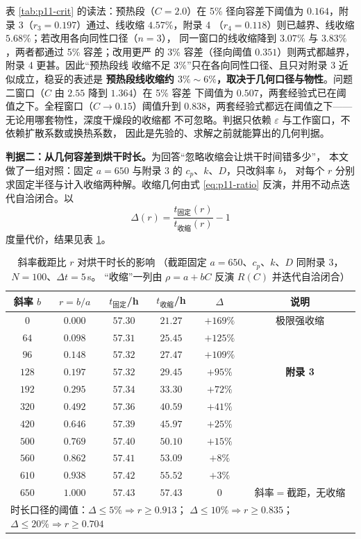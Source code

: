 \documentclass[12pt,a4paper,fontset=none]{ctexart}
\begin{document}
表 \ref{tab:p11-crit} 的读法：预热段（$C=2.0$）在 5\% 径向容差下阈值为
$0.164$，附录 3（$r_3=0.197$）通过、线收缩 $4.57\%$，附录 4
（$r_4=0.118$）则已越界、线收缩 $5.68\%$；若改用各向同性口径（$n=3$），
同一窗口的线收缩降到 $3.07\%$ 与 $3.83\%$，两者都通过 5\% 容差；改用更严
的 3\% 容差（径向阈值 $0.351$）则两式都越界，附录 4 更甚。因此“预热段线
收缩不足 $3\%$”只在各向同性口径、且只对附录 3 近似成立，稳妥的表述是
\textbf{预热段线收缩约 $3\%\sim6\%$，取决于几何口径与物性}。问题二窗口（$C$ 由 $2.55$ 降到 $1.364$）在 5\% 容差
下阈值为 $0.507$，两套经验式已在阈值之下。全程窗口（$C\to0.15$）阈值升到
$0.838$，两套经验式都远在阈值之下——无论用哪套物性，深度干燥段的收缩都
不可忽略。判据只依赖 $\varepsilon$ 与工作窗口，不依赖扩散系数或换热系数，
因此是先验的、求解之前就能算出的几何判据。

\textbf{判据二：从几何容差到烘干时长。}为回答“忽略收缩会让烘干时间错多少”，
本文做了一组对照：固定 $a=650$ 与附录 3 的 $c_p$、$k$、$D$，只改斜率 $b$，
对每个 $r$ 分别求固定半径与计入收缩两种解。收缩几何由式
\eqref{eq:p11-ratio} 反演，并用不动点迭代自洽闭合。以
\begin{equation}
  \Delta(r)=\frac{t_{\text{固定}}(r)}{t_{\text{收缩}}(r)}-1
  \label{eq:p11-delta}
\end{equation}
度量代价，结果见表 \ref{tab:p11-sweep}。

\begin{table}[htbp]
  \centering
  \caption{斜率截距比 $r$ 对烘干时长的影响
    （截距固定 $a=650$、$c_p$、$k$、$D$ 同附录 3，$N=100$、$\Delta t=5$\,s。
    “收缩”一列由 $\rho=a+bC$ 反演 $R(C)$ 并迭代自洽闭合）}
  \label{tab:p11-sweep}
  \small
  \begin{tabular}{cccccc}
    \toprule
    斜率 $b$ & $r=b/a$ & $t_{\text{固定}}$/h & $t_{\text{收缩}}$/h
      & $\Delta$ & 说明 \\
    \midrule
    $0$   & $0.000$ & $57.30$ & $21.27$ & $+169\%$ & 极限强收缩 \\
    $64$  & $0.098$ & $57.31$ & $25.45$ & $+125\%$ & \\
    $96$  & $0.148$ & $57.32$ & $27.47$ & $+109\%$ & \\
    $128$ & $0.197$ & $57.32$ & $29.45$ & $+95\%$  & \textbf{附录 3} \\
    $192$ & $0.295$ & $57.34$ & $33.30$ & $+72\%$  & \\
    $320$ & $0.492$ & $57.36$ & $40.59$ & $+41\%$  & \\
    $420$ & $0.646$ & $57.39$ & $45.97$ & $+25\%$  & \\
    $500$ & $0.769$ & $57.40$ & $50.10$ & $+15\%$  & \\
    $560$ & $0.862$ & $57.41$ & $53.09$ & $+8\%$   & \\
    $610$ & $0.938$ & $57.42$ & $55.52$ & $+3\%$   & \\
    $650$ & $1.000$ & $57.43$ & $57.43$ & $0$      & 斜率$=$截距，无收缩 \\
    \midrule
    \multicolumn{6}{l}{时长口径的阈值：$\Delta\le5\%\Rightarrow r\ge0.913$；
      $\Delta\le10\%\Rightarrow r\ge0.835$；$\Delta\le20\%\Rightarrow r\ge0.704$} \\
    \bottomrule
  \end{tabular}
\end{table}
\end{document}
